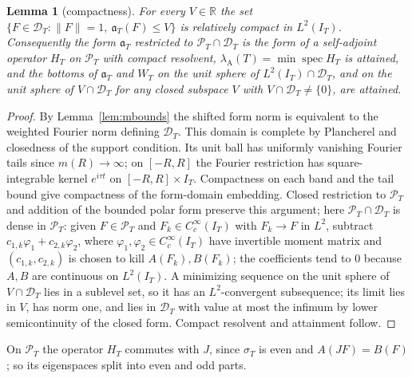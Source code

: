 \documentclass[10pt]{amsart}
\newtheorem{lemma}[theorem]{Lemma}
\theoremstyle{definition}
\theoremstyle{remark}
\newcommand{\R}{\mathbb R}
\newcommand{\PT}{\mathcal P_T}
\newcommand{\IT}{I_T}
\newcommand{\lamA}{\lambda_{\mathrm A}(T)}
\newcommand{\sT}{\sigma_T}
\begin{document}
\begin{lemma}[compactness]\label{lem:compact}
For every $V\in\R$ the set $\{F\in\mathcal D_T:\|F\|=1,\ \mathfrak a_T(F)\le V\}$ is relatively compact in
$L^2(\IT)$. Consequently the form $\mathfrak a_T$ restricted to $\PT\cap\mathcal D_T$ is the form of a
self-adjoint operator $H_T$ on $\PT$ with compact resolvent, $\lamA=\min\operatorname{spec}H_T$ is attained,
and the bottoms of $\mathfrak a_T$ and $W_T$ on the unit sphere of $L^2(\IT)\cap\mathcal D_T$, and on the unit sphere of
$V\cap\mathcal D_T$ for any closed subspace $V$ with $V\cap\mathcal D_T\ne\{0\}$, are attained.
\end{lemma}
\begin{proof}
By Lemma~\ref{lem:mbounds} the shifted form norm is equivalent to the
weighted Fourier norm defining $\mathcal D_T$. This domain is complete
by Plancherel and closedness of the support condition. Its unit ball
has uniformly vanishing Fourier tails since $m(R)\to\infty$; on
$[-R,R]$ the Fourier restriction has square-integrable kernel
$e^{i\tau t}$ on $[-R,R]\times\IT$. Compactness on each band and
the tail bound give compactness of the form-domain embedding.
Closed restriction to $\PT$ and addition of the bounded polar form
preserve this argument; here $\PT\cap\mathcal D_T$ is dense in $\PT$: given $F\in\PT$ and $F_k\in C_c^\infty(\IT)$
with $F_k\to F$ in $L^2$, subtract $c_{1,k}\varphi_1+c_{2,k}\varphi_2$, where $\varphi_1,\varphi_2\in C_c^\infty(\IT)$ have
invertible moment matrix and $(c_{1,k},c_{2,k})$ is chosen to kill $A(F_k),B(F_k)$; the coefficients tend to $0$
because $A,B$ are continuous on $L^2(\IT)$. A minimizing sequence on the unit sphere of $V\cap\mathcal D_T$ lies in
a sublevel set, so it has an $L^2$-convergent subsequence; its limit lies in $V$, has norm one, and lies in
$\mathcal D_T$ with value at most the infimum by lower semicontinuity of the closed form. Compact resolvent and attainment follow.
\end{proof}

On $\PT$ the operator $H_T$ commutes with $J$, since $\sT$ is even and $A(JF)=B(F)$; so its eigenspaces
split into even and odd parts.
\end{document}
